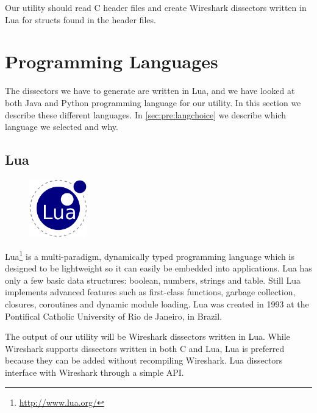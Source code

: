 Our utility should read C header files and create Wireshark dissectors written
in Lua for structs found in the header files.


\section{Programming Languages}
\label{sec:pre:langs}
The dissectors we have to generate are written in Lua, and we have looked at
both Java and Python programming language for our utility. In this section we
describe these different languages. In \autoref{sec:pre:langchoice} we describe
which language we selected and why.

\subsection{Lua}
\begin{figure}
	\vspace{-10pt}
	\includegraphics[width=2.5cm]{./planning/img/lua_logo}
	\vspace{-20pt}
\end{figure}
Lua\footnote{\url{http://www.lua.org/}} is a multi-paradigm, dynamically typed
programming language which is designed to be lightweight so it can easily be
embedded into applications. Lua has only a few basic data structures: boolean,
numbers, strings and table. Still Lua implements advanced features such as
first-class functions, garbage collection, closures, coroutines and dynamic
module loading. Lua was created in 1993 at the Pontifical Catholic University
of Rio de Janeiro, in Brazil.

The output of our utility will be Wireshark dissectors written in Lua. While
Wireshark supports dissectors written in both C and Lua, Lua is preferred
because they can be added without recompiling Wireshark. Lua dissectors
interface with Wireshark through a simple API.

